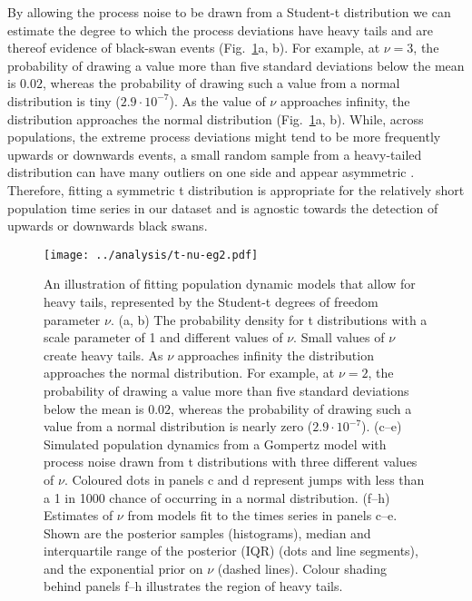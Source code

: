 By allowing the process noise to be drawn from a Student-t distribution we can
estimate the degree to which the process deviations have heavy tails and are
thereof evidence of black-swan events (Fig.~\ref{fig:didactic}a, b). For
example, at $\nu = 3$, the probability of drawing a value more than five
standard deviations below the mean is $0.02$, whereas the probability of
drawing such a value from a normal distribution is tiny ($2.9\cdot10^{-7}$).
As the value of $\nu$ approaches infinity, the distribution approaches the
normal distribution (Fig.~\ref{fig:didactic}a, b). While, across populations,
the extreme process deviations might tend to be more frequently upwards or
downwards events, a small random sample from a heavy-tailed distribution can
have many outliers on one side and appear asymmetric \citep{gelman2013a}.
Therefore, fitting a symmetric t distribution is appropriate for the
relatively short population time series in our dataset and is agnostic towards
the detection of upwards or downwards black swans.

\begin{figure}[htbp]
\begin{center}
\texttt{[image: ../analysis/t-nu-eg2.pdf]}
\caption[An illustration of fitting population dynamic models that allow for heavy
tails, represented by the Student-t degrees of freedom parameter $\nu$.]{
An illustration of fitting population dynamic models that allow for heavy
tails, represented by the Student-t degrees of freedom parameter $\nu$. (a, b)
The probability density for t distributions with a scale parameter of 1 and
different values of $\nu$. Small values of $\nu$ create heavy tails. As $\nu$
approaches infinity the distribution approaches the normal distribution. For
example, at $\nu = 2$, the probability of drawing a value more than five
standard deviations below the mean is $0.02$, whereas the probability of drawing
such a value from a normal distribution is nearly zero ($2.9\cdot10^{-7}$).
(c--e) Simulated population dynamics from a Gompertz model with process noise
drawn from t distributions with three different values of $\nu$. Coloured dots
in panels c and d represent jumps with less than a 1 in 1000 chance of
occurring in a normal distribution. (f--h) Estimates of $\nu$ from models fit
to the times series in panels c--e. Shown are the posterior samples
(histograms), median and interquartile range of the posterior (IQR) (dots and
line segments), and the exponential prior on $\nu$ (dashed lines). Colour
shading behind panels f--h illustrates the region of heavy tails.
}
\label{fig:didactic}
\end{center}
\end{figure}

